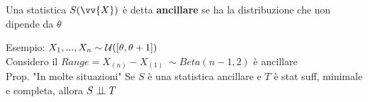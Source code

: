 \begin{defi}
    Una statistica $S(\vv{X})$ è detta \textbf{ancillare} se ha la distribuzione che non dipende da $\theta$ 
\end{defi}
\phantom{}

Esempio: $X_1,...,X_n\sim \mathcal U ([\theta,\theta+1])$\\
Considero il $Range= X_{(n)}-X_{(1)} \ \sim Beta(n-1,2)$ è ancillare \\



Prop. "In molte situazioni" Se $S$ è una statistica ancillare e $T$ è stat suff, minimale e completa, allora $S\perp \!\!\! \perp T$\\

